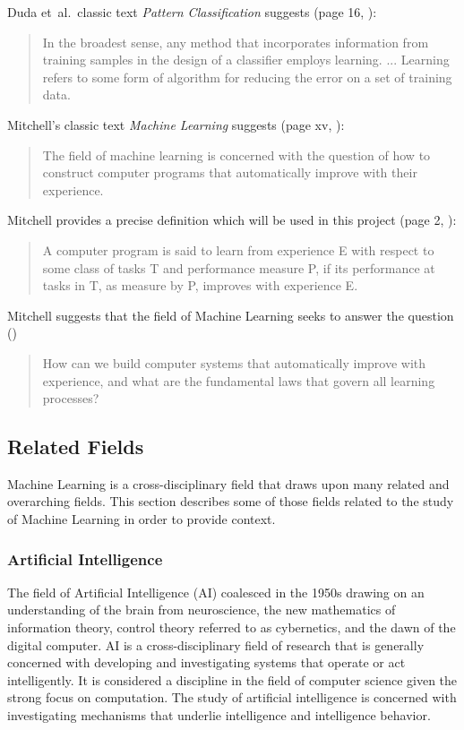 Duda et~al.\ classic text \emph{Pattern Classification} suggests (page 16, \cite{Duda2001}):

\begin{quotation}
In the broadest sense, any method that incorporates information from training samples in the design of a classifier employs learning. ... Learning refers to some form of algorithm for reducing the error on a set of training data.
\end{quotation}

Mitchell's classic text \emph{Machine Learning} suggests (page xv, \cite{Mitchell1997}):

\begin{quotation}
The field of machine learning is concerned with the question of how to construct computer programs that automatically improve with their experience.
\end{quotation}

Mitchell provides a precise definition which will be used in this project (page 2, \cite{Mitchell1997}):

\begin{quotation}
A computer program is said to learn from experience E with respect to some class of tasks T and performance measure P, if its performance at tasks in T, as measure by P, improves with experience E.
\end{quotation}

Mitchell suggests that the field of Machine Learning seeks to answer the question (\cite{Mitchell2006})

\begin{quotation}
How can we build computer systems that automatically improve with experience, and what are the fundamental laws that govern all learning processes?
\end{quotation}

\subsection{Related Fields}
\label{subsec:related_fields}
Machine Learning is a cross-disciplinary field that draws upon many related and overarching fields. This section describes some of those fields related to the study of Machine Learning in order to provide context.

\subsubsection{Artificial Intelligence}
The field of Artificial Intelligence (AI) coalesced in the 1950s drawing on an understanding of the brain from neuroscience, the new mathematics of information theory, control theory referred to as cybernetics, and the dawn of the digital computer. AI is a cross-disciplinary field of research that is generally concerned with developing and investigating systems that operate or act intelligently. It is considered a discipline in the field of computer science given the strong focus on computation. The study of artificial intelligence is concerned with investigating mechanisms that underlie intelligence and intelligence behavior.


